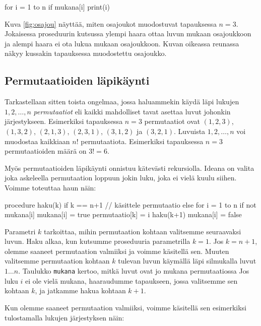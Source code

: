 \begin{code}
for i = 1 to n
    if mukana[i]
        print(i)
\end{code}

Kuva \ref{fig:osajou} näyttää,
miten osajoukot muodostuvat tapauksessa $n=3$.
Jokaisessa proseduurin kutsussa ylempi haara ottaa luvun mukaan osajoukkoon
ja alempi haara ei ota lukua mukaan osajoukkoon.
Kuvan oikeassa reunassa näkyy kussakin tapauksessa muodostettu osajoukko.

\subsection{Permutaatioiden läpikäynti}


Tarkastellaan sitten toista ongelmaa, jossa haluammekin
käydä läpi lukujen $1,2,\dots,n$ \emph{permutaatiot}
eli kaikki mahdolliset tavat asettaa luvut johonkin järjestykseen.
Esimerkiksi tapauksessa $n=3$ permutaatiot ovat
$(1,2,3)$, $(1,3,2)$, $(2,1,3)$, $(2,3,1)$, $(3,1,2)$ ja $(3,2,1)$.
Luvuista $1,2,\dots,n$ voi muodostaa kaikkiaan $n!$ permutaatiota.
Esimerkiksi tapauksessa $n=3$ permutaatioiden määrä on
$3!=6$.

Myös permutaatioiden läpikäynti onnistuu kätevästi rekursiolla.
Ideana on valita joka askeleella permutaation loppuun
jokin luku, joka ei vielä kuulu siihen.
Voimme toteuttaa haun näin:

\begin{code}
procedure haku(k)
    if k == n+1
        // käsittele permutaatio
    else
        for i = 1 to n
            if not mukana[i]
                mukana[i] = true
                permutaatio[k] = i
                haku(k+1)
                mukana[i] = false
\end{code}

Parametri $k$ tarkoittaa, mihin permutaation kohtaan
valitsemme seuraavaksi luvun.
Haku alkaa, kun kutsumme proseduuria parametrilla $k=1$.
Jos $k=n+1$, olemme saaneet permutaation valmiiksi
ja voimme käsitellä sen.
Muuten valitsemme permutaation kohtaan $k$ tulevan luvun
käymällä läpi silmukalla luvut $1 \dots n$.
Taulukko \texttt{mukana} kertoo, mitkä luvut
ovat jo mukana permutaatiossa
Jos luku $i$ ei ole vielä mukana, haaraudumme tapaukseen,
jossa valitsemme sen kohtaan $k$, ja jatkamme hakua kohtaan $k+1$.

Kun olemme saaneet permutaation valmiiksi,
voimme käsitellä sen esimerkiksi tulostamalla lukujen
järjestyksen näin:

